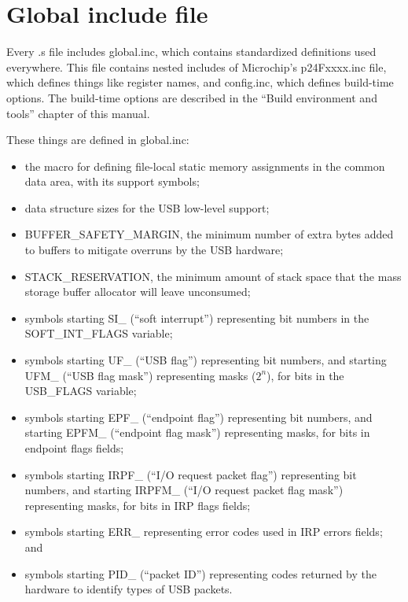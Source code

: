 \section{Global include file}

Every .s file includes global.inc, which contains standardized definitions
used everywhere.  This file contains nested includes of Microchip's
p24Fxxxx.inc file, which defines things like register names, and config.inc,
which defines build-time options.  The build-time options are described in the
``Build environment and tools'' chapter of this manual.

These things are defined in global.inc:
\begin{itemize}
  \item the  macro for defining file-local static memory
    assignments in the common data area, with its support symbols;
  \item data structure sizes for the USB low-level support;
  \item BUFFER\_SAFETY\_MARGIN, the minimum number of extra bytes added to
    buffers to mitigate overruns by the USB hardware;
  \item STACK\_RESERVATION, the minimum amount of stack space that the mass
    storage buffer allocator will leave unconsumed;
  \item symbols starting SI\_ (``soft interrupt'') representing bit numbers
    in the SOFT\_INT\_FLAGS variable;
  \item symbols starting UF\_ (``USB flag'') representing bit numbers, and
    starting UFM\_ (``USB flag mask'') representing masks ($2^n$), for bits
    in the USB\_FLAGS variable;
  \item symbols starting EPF\_ (``endpoint flag'') representing bit numbers,
    and starting EPFM\_ (``endpoint flag mask'') representing masks, for
    bits in endpoint flags fields;
  \item symbols starting IRPF\_ (``I/O request packet flag'') representing bit
    numbers, and starting IRPFM\_ (``I/O request packet flag mask'')
    representing masks, for bits in IRP flags fields;
  \item symbols starting ERR\_ representing error codes used in IRP errors
    fields; and
  \item symbols starting PID\_ (``packet ID'') representing codes returned
    by the hardware to identify types of USB packets.
\end{itemize}
